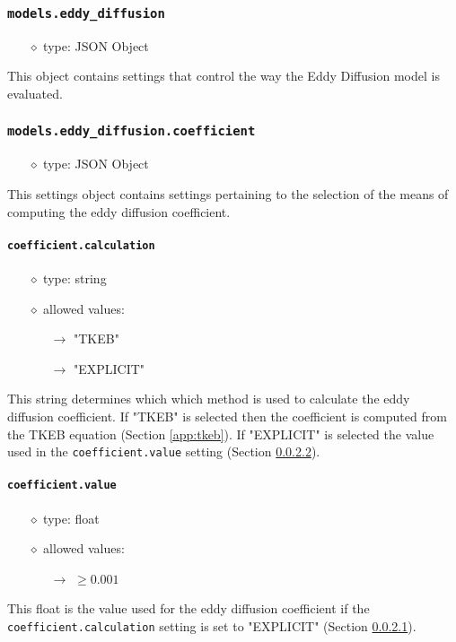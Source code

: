 \documentclass[]{article}
\def\code#1{\texttt{#1}}
\begin{document}
\subsubsection{\code{models.eddy\_diffusion}}
\begin{itemize}
    \item[$\diamond$] type: JSON Object 
\end{itemize}
This object contains settings that control the way the Eddy Diffusion model is
evaluated.

\subsubsection{\code{models.eddy\_diffusion.coefficient}}
\begin{itemize}
    \item[$\diamond$] type: JSON Object 
\end{itemize}
This settings object contains settings pertaining to the selection of the means
of computing the eddy diffusion coefficient.

\paragraph{\code{coefficient.calculation}}\label{sec:coeffcalc}
\begin{itemize}
    \item[$\diamond$] type: string 
    \item[$\diamond$] allowed values:
    \begin{itemize}
        \item[$\rightarrow$] "TKEB"
        \item[$\rightarrow$] "EXPLICIT"
    \end{itemize}
\end{itemize}
This string determines which which method is used to calculate the eddy
diffusion coefficient. If "TKEB" is selected then the coefficient is computed
from the TKEB equation (Section \ref{app:tkeb}). If "EXPLICIT" is selected 
the value used in the \code{coefficient.value} setting
(Section \ref{sec:coeffvalue}).


\paragraph{\code{coefficient.value}}\label{sec:coeffvalue}
\begin{itemize}
    \item[$\diamond$] type: float 
    \item[$\diamond$] allowed values:
    \begin{itemize}
        \item[$\rightarrow$] $\geq0.001$
    \end{itemize}
\end{itemize}
This float is the value used for the eddy diffusion coefficient if the
\code{coefficient.calculation} setting is set to
"EXPLICIT" (Section \ref{sec:coeffcalc}).
\end{document}
